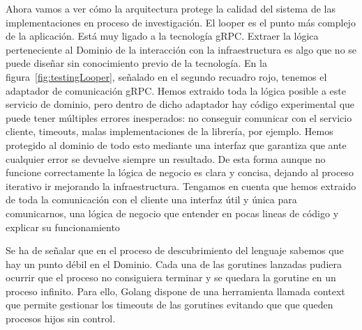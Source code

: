 Ahora vamos a ver cómo la arquitectura protege la calidad del sistema de las implementaciones en proceso de investigación. El looper es el punto más complejo de la aplicación. Está muy ligado a la tecnología gRPC. Extraer la lógica perteneciente al Dominio de la interacción con la infraestructura es algo que no se puede diseñar sin conocimiento previo de la tecnología. En la figura~\cref{fig:testingLooper}, señalado en el segundo recuadro rojo, tenemos el adaptador de comunicación gRPC. Hemos extraido toda la lógica posible a este servicio de dominio, pero dentro de dicho adaptador hay código experimental que puede tener múltiples errores inesperados: no conseguir comunicar con el servicio cliente, timeouts, malas implementaciones de la librería, por ejemplo. Hemos protegido al dominio de todo esto mediante una interfaz que garantiza que ante cualquier error se devuelve siempre un resultado. De esta forma aunque no funcione correctamente la lógica de negocio es clara y concisa, dejando al proceso iterativo ir mejorando la infraestructura. Tengamos en cuenta que hemos extraido de toda la comunicación con el cliente una interfaz útil y única para comunicarnos, una lógica de negocio que entender en pocas lineas de código y explicar su funcionamiento

Se ha de señalar que en el proceso de descubrimiento del lenguaje sabemos que hay un punto débil en el Dominio. Cada una de las gorutines lanzadas pudiera ocurrir que el proceso no consiguiera terminar y se quedara la gorutine en un proceso infinito. Para ello, Golang dispone de una herramienta llamada context que permite gestionar los timeouts de las gorutines evitando que que queden procesos hijos sin control.

